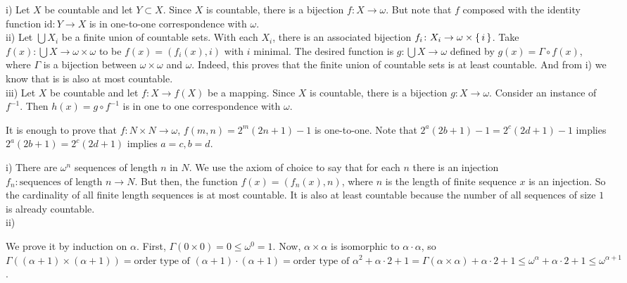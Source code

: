 \documentclass[12pt]{article}
\theoremstyle{definition}
\newenvironment{customthm}[1]
  {\renewcommand\theinnercustomthm{#1}\innercustomthm}
  {\endinnercustomthm}
\begin{document}
\begin{customthm}{I.3.2}
    i) Let $X$ be countable and let $Y \subset X$. Since $X$ is countable, there is a bijection $f \colon X \to \omega$. But note that $f$ composed with the identity function $\mathrm{id} \colon Y \to X$ is in one-to-one correspondence with $\omega$. \\
    ii) Let $\bigcup X_i$ be a finite union of countable sets. With each $X_i$, there is an associated bijection $f_i \colon X_i \to \omega \times \{\,{i}\,\}$. Take $f(x) \colon \bigcup X \to \omega \times \omega$ to be $f(x) = (f_i(x),i)$ with $i$ minimal. The desired function is $g \colon \bigcup X \to \omega$ defined by $g(x) = \Gamma \circ f(x)$, where $\Gamma$ is a bijection between $\omega \times \omega$ and $\omega$. Indeed, this proves that the finite union of countable sets is at least countable. And from i) we know that is is also at most countable. \\
    iii) Let $X$ be countable and let $f \colon X \to f(X)$ be a mapping. Since $X$ is countable, there is a bijection $g \colon X \to \omega$. Consider an instance of $f^{-1}$. Then $h(x) = g \circ f^{-1}$ is in one to one correspondence with $\omega$.
\end{customthm}

\begin{customthm}{I.3.3}
    It is enough to prove that $f \colon N \times N \to \omega$, $f(m,n) = 2^m(2n+1)-1$ is one-to-one. Note that $2^a(2b+1)-1 = 2^c(2d+1) - 1$ implies $2^a(2b+1) = 2^c(2d+1)$ implies $a=c, b=d$.
\end{customthm}

\begin{customthm}{I.3.4}
    i) There are $\omega^n$ sequences of length $n$ in $N$. We use the axiom of choice to say that for each $n$ there is an injection $f_n \colon \text{sequences of length }n \to N$. But then, the function $f(x) = (f_n(x),n)$, where $n$ is the length of finite sequence $x$ is an injection. So the cardinality of all finite length sequences is at most countable. It is also at least countable because the number of all sequences of size $1$ is already countable. \\
    ii) 
\end{customthm}

\begin{customthm}{I.3.5}
    We prove it by induction on $\alpha$. First, $\Gamma(0 \times 0) = 0 \leq \omega^0 = 1$. Now, $\alpha \times \alpha$ is isomorphic to $\alpha \cdot \alpha$, so $\Gamma((\alpha+1) \times (\alpha+1)) = \text{order type of } (\alpha+1) \cdot (\alpha+1) = \text{order type of } \alpha^2 + \alpha \cdot 2 + 1 = \Gamma(\alpha \times \alpha) + \alpha \cdot 2 + 1 \leq \omega^\alpha + \alpha \cdot 2 + 1 \leq \omega^{\alpha+1}$.
\end{customthm}
\end{document}
